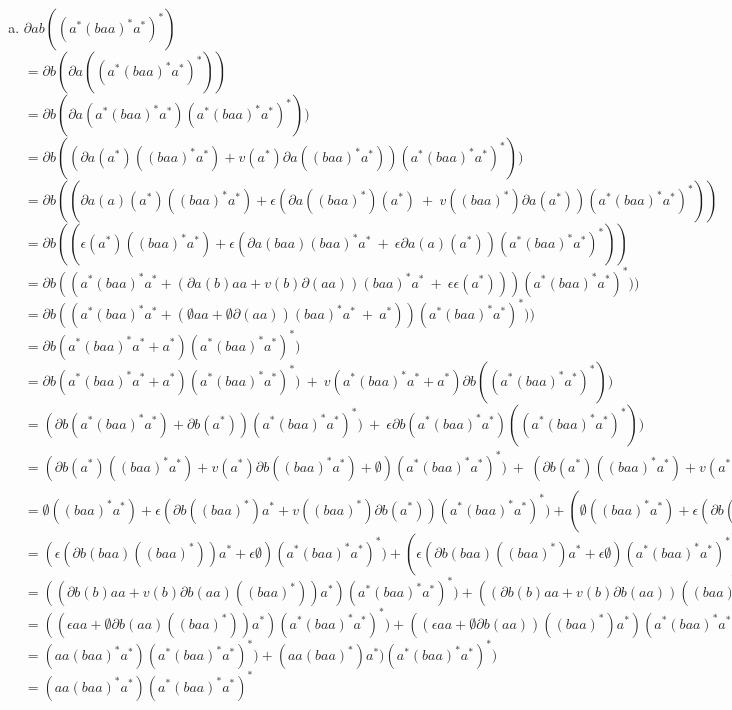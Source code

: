 \documentclass{article}
\begin{document}
\begin{enumerate}
{\begin{enumerate}[a)]
		\item{
		$\partial{ab} ((a^*(baa)^*a^*)^*)$\\
		$= \partial{b} (\partial{a}((a^*(baa)^*a^*)^*))$\\		
		$= \partial{b} (\partial{a}(a^*(baa)^*a^*)(a^*(baa)^*a^*)^*))$\\
		$= \partial{b} ((\partial{a}(a^*)((baa)^*a^*) + v(a^*)\partial{a}((baa)^*a^*))(a^*(baa)^*a^*)^*))$\\
		$= \partial{b} ((\partial{a}(a)(a^*)((baa)^*a^*) + \epsilon (\partial{a}((baa)^*)(a^*) \ + \ v((baa)^*)\partial{a}(a^*))(a^*(baa)^*a^*)^*))$\\
		$= \partial{b} ((\epsilon (a^*)((baa)^*a^*) + \epsilon (\partial{a}(baa)(baa)^*a^* \ + \ \epsilon \partial{a}(a)(a^*))(a^*(baa)^*a^*)^*))$\\
		$= \partial{b} ((a^*(baa)^*a^* + (\partial{a}(b)aa + v(b)\partial(aa))(baa)^*a^* \ + \ \epsilon \epsilon(a^*)))(a^*(baa)^*a^*)^*))$\\
		$= \partial{b} ((a^*(baa)^*a^* + (\emptyset aa + \emptyset \partial(aa))(baa)^*a^* \ + \ a^*))(a^*(baa)^*a^*)^*))$\\							
		$= \partial{b} (a^*(baa)^*a^* + a^*)(a^*(baa)^*a^*)^*)$\\
		$= \partial{b}(a^*(baa)^*a^* + a^*)(a^*(baa)^*a^*)^*) \ + \ v(a^*(baa)^*a^* + a^*)\partial{b}((a^*(baa)^*a^*)^*))$\\
		$= (\partial{b}(a^*(baa)^*a^*) + \partial{b}(a^*))(a^*(baa)^*a^*)^*) \ + \ \epsilon \partial{b}(a^*(baa)^*a^*)((a^*(baa)^*a^*)^*))$\\	
		$= (\partial{b}(a^*)((baa)^*a^*) + v(a^*)\partial{b}((baa)^*a^*)+ \emptyset)(a^*(baa)^*a^*)^*) \ + \ (\partial{b}(a^*)((baa)^*a^*) + v(a^*)\partial{b}((baa)^*a^*))((a^*(baa)^*a^*)^*))$\\	
		$= \emptyset((baa)^*a^*) + \epsilon(\partial{b}((baa)^*)a^* + v((baa)^*)\partial{b}(a^*))(a^*(baa)^*a^*)^*)+ (\emptyset((baa)^*a^*) + \epsilon(\partial{b}((baa)^*)a^* + v((baa)^*)\partial{b}(a^*))(a^*(baa)^*a^*)^*) $\\
		$= (\epsilon(\partial{b}(baa)((baa)^*))a^* + \epsilon \emptyset )(a^*(baa)^*a^*)^*)+ (\epsilon(\partial{b}(baa)((baa)^*)a^* + \epsilon \emptyset)(a^*(baa)^*a^*)^*) $\\
		$=((\partial{b}(b)aa + v(b)\partial{b}(aa)((baa)^*))a^*)(a^*(baa)^*a^*)^*) + ((\partial{b}(b)aa + v(b)\partial{b}(aa))((baa)^*)a^*)(a^*(baa)^*a^*)^*) $\\
		$=((\epsilon aa + \emptyset \partial{b}(aa)((baa)^*))a^*)(a^*(baa)^*a^*)^*) + ((\epsilon aa + \emptyset \partial{b}(aa))((baa)^*)a^*)(a^*(baa)^*a^*)^*) $\\
			$= (aa(baa)^*a^*)(a^*(baa)^*a^*)^*) + (aa(baa)^*)a^*)(a^*(baa)^*a^*)^*) $\\
			$= (aa(baa)^*a^*)(a^*(baa)^*a^*)^*$\\
		
}
\end{enumerate}}
\end{enumerate}
\end{document}
